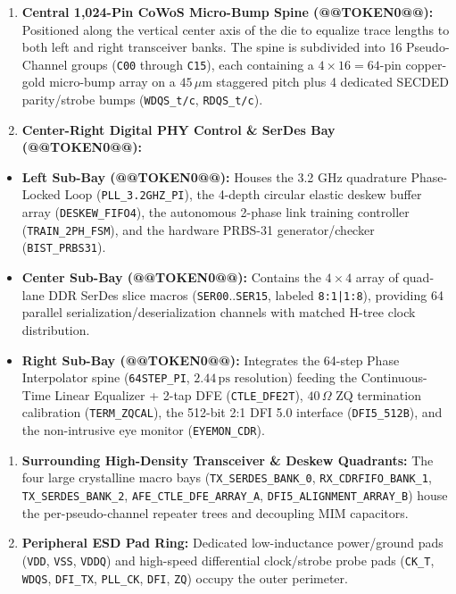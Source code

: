 \documentclass[journal,10pt,twocolumn]{IEEEtran}
\begin{document}
\begin{enumerate}
  \item \textbf{Central 1,024-Pin CoWoS Micro-Bump Spine (@@TOKEN0@@):} Positioned along the vertical center axis of the die to equalize trace lengths to both left and right transceiver banks. The spine is subdivided into 16 Pseudo-Channel groups (\texttt{C00} through \texttt{C15}), each containing a $4 \times 16 = 64$-pin copper-gold micro-bump array on a $45\,\mu\text{m}$ staggered pitch plus 4 dedicated SECDED parity/strobe bumps (\texttt{WDQS\_t/c}, \texttt{RDQS\_t/c}).
  \item \textbf{Center-Right Digital PHY Control \& SerDes Bay (@@TOKEN0@@):}
\end{enumerate}
\begin{itemize}
  \item \textbf{Left Sub-Bay (@@TOKEN0@@):} Houses the 3.2 GHz quadrature Phase-Locked Loop (\texttt{PLL\_3.2GHZ\_PI}), the 4-depth circular elastic deskew buffer array (\texttt{DESKEW\_FIFO4}), the autonomous 2-phase link training controller (\texttt{TRAIN\_2PH\_FSM}), and the hardware PRBS-31 generator/checker (\texttt{BIST\_PRBS31}).
  \item \textbf{Center Sub-Bay (@@TOKEN0@@):} Contains the $4 \times 4$ array of quad-lane DDR SerDes slice macros (\texttt{SER00}..\texttt{SER15}, labeled \texttt{8:1|1:8}), providing 64 parallel serialization/deserialization channels with matched H-tree clock distribution.
  \item \textbf{Right Sub-Bay (@@TOKEN0@@):} Integrates the 64-step Phase Interpolator spine (\texttt{64STEP\_PI}, $2.44\,\text{ps}$ resolution) feeding the Continuous-Time Linear Equalizer + 2-tap DFE (\texttt{CTLE\_DFE2T}), $40\,\Omega$ ZQ termination calibration (\texttt{TERM\_ZQCAL}), the 512-bit 2:1 DFI 5.0 interface (\texttt{DFI5\_512B}), and the non-intrusive eye monitor (\texttt{EYEMON\_CDR}).
\end{itemize}
\begin{enumerate}
  \item \textbf{Surrounding High-Density Transceiver \& Deskew Quadrants:} The four large crystalline macro bays (\texttt{TX\_SERDES\_BANK\_0}, \texttt{RX\_CDRFIFO\_BANK\_1}, \texttt{TX\_SERDES\_BANK\_2}, \texttt{AFE\_CTLE\_DFE\_ARRAY\_A}, \texttt{DFI5\_ALIGNMENT\_ARRAY\_B}) house the per-pseudo-channel repeater trees and decoupling MIM capacitors.
  \item \textbf{Peripheral ESD Pad Ring:} Dedicated low-inductance power/ground pads (\texttt{VDD}, \texttt{VSS}, \texttt{VDDQ}) and high-speed differential clock/strobe probe pads (\texttt{CK\_T}, \texttt{WDQS}, \texttt{DFI\_TX}, \texttt{PLL\_CK}, \texttt{DFI}, \texttt{ZQ}) occupy the outer perimeter.
\end{enumerate}
\end{document}
